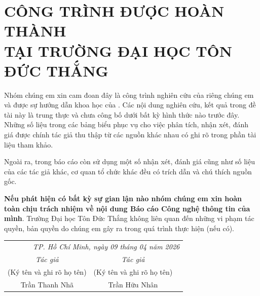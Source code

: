 \section*{ CÔNG TRÌNH ĐƯỢC HOÀN THÀNH\\TẠI TRƯỜNG ĐẠI HỌC TÔN ĐỨC THẮNG}

	Nhóm chúng em xin cam đoan đây là công trình nghiên cứu của riêng chúng em và được sự hướng dẫn khoa học của \hl{\mbox{\gvhd}}. Các nội dung nghiên cứu, kết quả trong đề tài này là trung thực và chưa công bố dưới bất kỳ hình thức nào trước đây. Những số liệu trong các bảng biểu phục vụ cho việc phân tích, nhận xét, đánh giá được chính tác giả thu thập từ các nguồn khác nhau có ghi rõ trong phần tài liệu tham khảo.
 
	Ngoài ra, trong báo cáo còn sử dụng một số nhận xét, đánh giá cũng như số liệu của các tác giả khác, cơ quan tổ chức khác đều có trích dẫn và chú thích nguồn gốc.
 
	\textbf{Nếu phát hiện có bất kỳ sự gian lận nào nhóm chúng em xin hoàn toàn chịu trách nhiệm về nội dung Báo cáo Công nghệ thông tin của mình}. Trường Đại học Tôn Đức Thắng không liên quan đến những vi phạm tác quyền, bản quyền do chúng em gây ra trong quá trình thực hiện (nếu có).
    
\begin{flushright}
    \begin{tabular}{ccc}
        \multicolumn{3}{r}{\textit{TP. Hồ Chí Minh, ngày 09 tháng 04 năm 2026}} \\
        \noalign{\vspace{0.5cm}} %
         \textit{Tác giả} & \textit{Tác giả} \\
        (Ký tên và ghi rõ họ tên) & (Ký tên và ghi rõ họ tên) \\
        \noalign{\vspace{2cm}}
        Trần Thanh Nhã & Trần Hữu Nhân \\
    \end{tabular}
    \end{flushright}
\newpage
